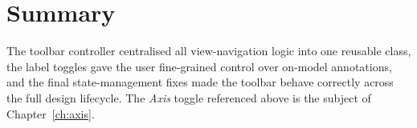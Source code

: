 

\section{Summary}
The toolbar controller centralised all view-navigation logic into one reusable class, the
label toggles gave the user fine-grained control over on-model annotations, and the final
state-management fixes made the toolbar behave correctly across the full design lifecycle. The
\emph{Axis} toggle referenced above is the subject of Chapter~\ref{ch:axis}.
